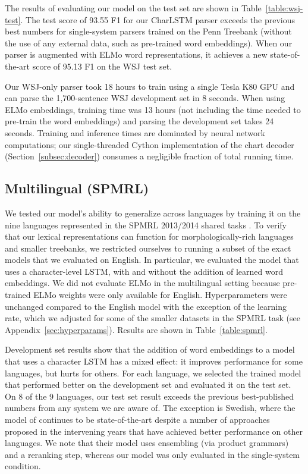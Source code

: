 \documentclass[11pt,a4paper]{article}
\begin{document}
The results of evaluating our model on the test set are shown in Table~\ref{table:wsj-test}. The test score of 93.55 F1 for our CharLSTM parser exceeds the previous best numbers for single-system parsers trained on the Penn Treebank (without the use of any external data, such as pre-trained word embeddings). When our parser is augmented with ELMo word representations, it achieves a new state-of-the-art score of 95.13 F1 on the WSJ test set.

Our WSJ-only parser took 18 hours to train using a single Tesla K80 GPU and can parse the 1,700-sentence WSJ development set in 8 seconds. When using ELMo embeddings, training time was 13 hours (not including the time needed to pre-train the word embeddings) and parsing the development set takes 24 seconds. Training and inference times are dominated by neural network computations; our single-threaded Cython implementation of the chart decoder (Section~\ref{subsec:decoder}) consumes a negligible fraction of total running time.

\subsection{Multilingual (SPMRL)}

We tested our model's ability to generalize across languages by training it on the nine languages represented in the SPMRL 2013/2014 shared tasks \citep{seddah_overview_2013}. To verify that our lexical representations can function for morphologically-rich languages and smaller treebanks, we restricted ourselves to running a subset of the exact models that we evaluated on English. In particular, we evaluated the model that uses a character-level LSTM, with and without the addition of learned word embeddings.
We did not evaluate ELMo in the multilingual setting because pre-trained ELMo weights were only available for English. Hyperparameters were unchanged compared to the English model with the exception of the learning rate, which we adjusted for some of the smaller datasets in the SPMRL task (see Appendix~\ref{sec:hyperparams}). Results are shown in Table~\ref{table:spmrl}.

Development set results show that the addition of word embeddings to a model that uses a character LSTM has a mixed effect: it improves performance for some languages, but hurts for others. For each language, we selected the trained model that performed better on the development set and evaluated it on the test set. On 8 of the 9 languages, our test set result exceeds the previous best-published numbers from any system we are aware of. The exception is Swedish, where the model of \citet{bjorkelund_ims-wroclaw-szeged-cis_2014} continues to be state-of-the-art despite a number of approaches proposed in the intervening years that have achieved better performance on other languages. We note that their model uses ensembling (via product grammars) and a reranking step, whereas our model was only evaluated in the single-system condition.
\end{document}
